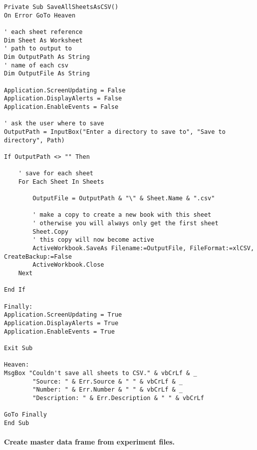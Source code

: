 \documentclass[12pt,]{article}
\let\oldparagraph\paragraph
\renewcommand{\paragraph}[1]{\oldparagraph{#1}\mbox{}}
\begin{document}
\begin{verbatim}
Private Sub SaveAllSheetsAsCSV()
On Error GoTo Heaven

' each sheet reference
Dim Sheet As Worksheet
' path to output to
Dim OutputPath As String
' name of each csv
Dim OutputFile As String

Application.ScreenUpdating = False
Application.DisplayAlerts = False
Application.EnableEvents = False

' ask the user where to save
OutputPath = InputBox("Enter a directory to save to", "Save to directory", Path)

If OutputPath <> "" Then

    ' save for each sheet
    For Each Sheet In Sheets

        OutputFile = OutputPath & "\" & Sheet.Name & ".csv"

        ' make a copy to create a new book with this sheet
        ' otherwise you will always only get the first sheet
        Sheet.Copy
        ' this copy will now become active
        ActiveWorkbook.SaveAs Filename:=OutputFile, FileFormat:=xlCSV, CreateBackup:=False
        ActiveWorkbook.Close
    Next

End If

Finally:
Application.ScreenUpdating = True
Application.DisplayAlerts = True
Application.EnableEvents = True

Exit Sub

Heaven:
MsgBox "Couldn't save all sheets to CSV." & vbCrLf & _
        "Source: " & Err.Source & " " & vbCrLf & _
        "Number: " & Err.Number & " " & vbCrLf & _
        "Description: " & Err.Description & " " & vbCrLf

GoTo Finally
End Sub

\end{verbatim}

\paragraph{Create master data frame from experiment
files.}\label{create-master-data-frame-from-experiment-files.}
\end{document}
